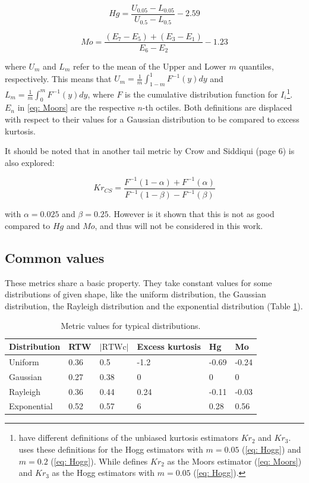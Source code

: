 	\begin{equation}        	   
		Hg=\frac{U_{0.05}-L_{0.05}}{U_{0.5}-L_{0.5}}-2.59
		\label{eq: Hogg}
	\end{equation}
	
	\begin{equation}               
		Mo=\frac{(E_7-E_5)+(E_3-E_1)}{E_6-E_2}-1.23
		\label{eq: Moors}
	\end{equation}
	
	where $U_{m}$ and $L_{m}$ refer to the mean of the Upper and Lower $m$ quantiles, respectively. This means that $U_{m}=\frac{1}{m}\int_{1-m}^1 F^{-1}(y)dy$ and $L_{m}=\frac{1}{m}\int_{0}^m F^{-1}(y)dy$, where $F$ is the cumulative distribution function for ${I_i}$\footnote{\cite{Bono_2019,KIM200456} have  different definitions of the unbiased kurtosis estimators $Kr_2$ and $Kr_3$. \cite{Bono_2019} uses these definitions for the Hogg estimators with $m=0.05$ (\cref{eq: Hogg}) and $m=0.2$ (\cref{eq: Hogg}). While \cite{KIM200456} defines $Kr_2$ as the Moors estimator (\cref{eq: Moors}) and $Kr_3$ as the Hogg estimators with $m=0.05$ (\cref{eq: Hogg}). }.
	 $E_n$ in \cref{eq: Moors} are the respective $n$-th octiles. 
	Both definitions are displaced with respect to their values for a Gaussian distribution to be compared to excess kurtosis.
	
	It should be noted that in \cite{KIM200456} another tail metric by Crow and Siddiqui (page 6) is also explored:
	
	\[
	Kr_{CS}=\frac{F^{-1}(1-\alpha)+F^{-1}(\alpha)}{F^{-1}(1-\beta)-F^{-1}(\beta)}
	\]
	
	with $\alpha = 0.025$ and $\beta= 0.25$. 
	However is it shown that this is not as good compared to $Hg$ and $Mo$, and thus will not be considered in this work.
		
	\subsection{Common values}
	
	These metrics share a basic property. They take constant values for some distributions of given shape, like the uniform distribution, the Gaussian distribution, the Rayleigh distribution and the exponential distribution (Table \ref{table: constant shape}).
	
	\begin{table}[h]
		\centering
		\caption{ \label{tab:indicescte} Metric values for typical distributions.}
		\begin{tabular}{| l | l | l | l  |l | l |}
			\hline
			Distribution & RTW & $\left| \mathrm{RTWc}\right| $  & Excess kurtosis  & Hg & Mo\\
			\hline
			Uniform & 0.36 & 0.5 & -1.2  & -0.69 & -0.24 \\
			Gaussian& 0.27 & 0.38 & 0 & 0 & 0\\
			Rayleigh & 0.36 & 0.44 & 0.24 & -0.11 & -0.03\\
			Exponential & 0.52 & 0.57 & 6 & 0.28 & 0.56 \\
			\hline
		\end{tabular}
		\label{table: constant shape}
	\end{table}
	
